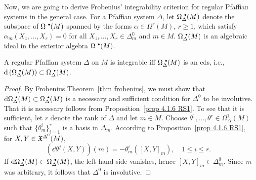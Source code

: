 Now, we are going to derive Frobenius' integrability criterion for regular Pfaffian systems in the general case. For a Pfaffian system $\Delta$, let $\Omega^{\smbullet }_\Delta(M)$ denote the subspace of $\Omega^{\smbullet }(M)$ spanned by the forms $\alpha\in\Omega^r(M)$, $r\geq 1$, which satisfy $\alpha_m(X_1,\ldots,X_r)=0$ for all $X_1,\ldots,X_r\in \Delta^0_m$ and $m\in M$. $\Omega^{\smbullet }_\Delta(M)$ is an algebraic ideal in the exterior algebra $\Omega^{\smbullet }(M)$.

\begin{thm}\label{thm 4.7.8 RS1}
    A regular Pfaffian system $\Delta$ on $M$ is integrable iff $\Omega^{\smbullet }_\Delta(M)$ is an \gls{eds}, i.e., $\dd \left(\Omega^{\smbullet }_\Delta(M)\right)\subset \Omega^{\smbullet }_\Delta(M)$.
\end{thm}
\begin{proof}
    By Frobenius Theorem~\ref{thm frobenius}, we must show that $\dd\Omega^{\smbullet }_\Delta(M)\subset \Omega^{\smbullet }_\Delta(M)$ is a necessary and sufficient condition for $\Delta^0$ to be involutive. That it is necessary follows from Proposition~\ref{prop 4.1.6 RS1}. To see that it is sufficient, let $r$ denote the rank of $\Delta$ and let $m\in M$. Choose $\theta^1,\ldots,\theta^r\in \Omega^1_\Delta(M)$ such that $\{\theta^i_m\}_{i=1}^r$ is a basis in $\Delta_m$. According to Proposition~\ref{prop 4.1.6 RS1}, for $X,Y\in\mathfrak{X}^{\Delta^0}(M)$, 
    \[\left(\dd \theta^j(X,Y)\right)(m)=-\theta^i_m([X,Y]_m),\quad 1\leq i\leq r.\]
    If $\dd\Omega^{\smbullet }_\Delta(M)\subset\Omega^{\smbullet }_\Delta(M)$, the left hand side vanishes, hence $[X,Y]_m\in\Delta_m^0$. Since $m$ was arbitrary, it follows that $\Delta^0$ is involutive.
\end{proof}

